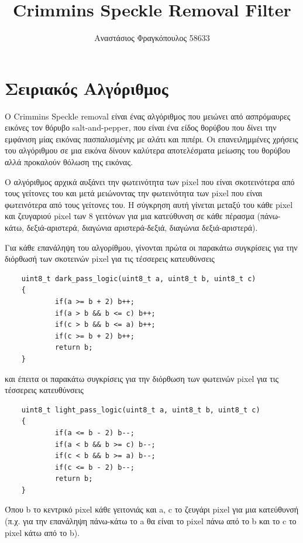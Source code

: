 \documentclass[12pt]{article}
\begin{document}
\title{Crimmins Speckle Removal Filter}
\author{Αναστάσιος Φραγκόπουλος 58633}
\date{}




\section{Σειριακός Αλγόριθμος}

\vspace{1em}

Ο Crimmins Speckle removal είναι ένας αλγόριθμος που μειώνει από ασπρόμαυρες εικόνες τον θόρυβο salt-and-pepper, που είναι ένα είδος θορύβου που δίνει την εμφάνιση μίας εικόνας πασπαλισμένης με αλάτι και πιπέρι. Οι επανειλημμένες χρήσεις του αλγόριθμου σε μια εικόνα δίνουν καλύτερα αποτελέσματα μείωσης του θορύβου αλλά προκαλούν θόλωση της εικόνας.

Ο αλγόριθμος αρχικά αυξάνει την φωτεινότητα των pixel που είναι σκοτεινότερα από τους γείτονες του και μετά μειώνοντας την φωτεινότητα των pixel που είναι φωτεινότερα από τους γείτονες του. Η σύγκρηση αυτή γίνεται μεταξύ του κάθε pixel και ζευγαριού pixel των 8 γειτόνων για μια κατεύθυνση σε κάθε πέρασμα (πάνω-κάτω, δεξιά-αριστερά, διαγώνια αριστερά-δεξιά, διαγώνια δεξιά-αριστερά).

Για κάθε επανάληψη του αλγορίθμου, γίνονται πρώτα οι παρακάτω συγκρίσεις για την διόρθωσή των σκοτεινών pixel για τις τέσσερεις κατευθύνσεις

\begin{verbatim}
    uint8_t dark_pass_logic(uint8_t a, uint8_t b, uint8_t c)
    {
            if(a >= b + 2) b++;
            if(a > b && b <= c) b++;
            if(c > b && b <= a) b++;
            if(c >= b + 2) b++;
            return b;
    }
\end{verbatim}

και έπειτα οι παρακάτω συγκρίσεις για την διόρθωση των φωτεινών pixel για τις τέσσερεις κατευθύνσεις

\begin{verbatim}
    uint8_t light_pass_logic(uint8_t a, uint8_t b, uint8_t c)
    {
            if(a <= b - 2) b--;
            if(a < b && b >= c) b--;
            if(c < b && b >= a) b--;
            if(c <= b - 2) b--;
            return b;
    }
\end{verbatim}

Όπου b το κεντρικό pixel κάθε γειτονιάς και a, c το ζευγάρι pixel για μια κατεύθυνσή (π.χ. για την επανάληψη πάνω-κάτω το a θα είναι το pixel πάνω από το b και το c το pixel κάτω από το b).\\
\end{document}
